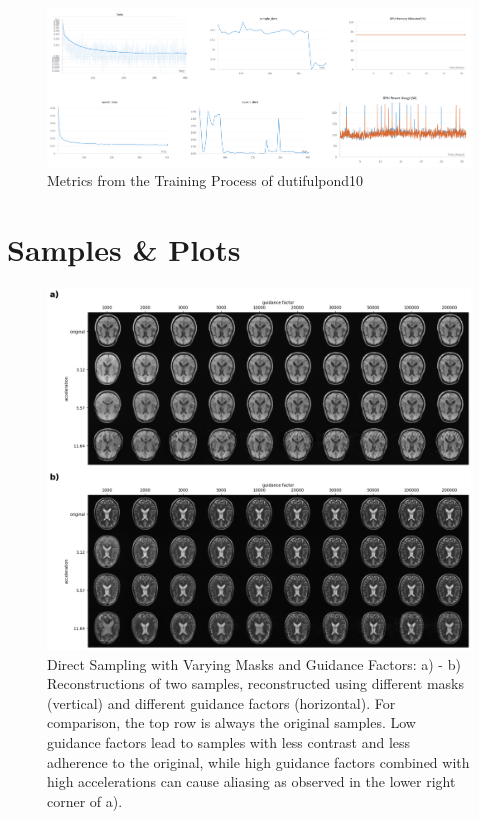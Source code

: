 \begin{figure}
    \centering
    \includegraphics[width=\textwidth]{images/dutifulpondmetrics.png}
    \caption[Metrics from the Training Process of dutifulpond10]{Metrics from the Training Process of dutifulpond10}
\end{figure}

\chapter{Samples \& Plots}
\begin{figure}[h]
    \centering
    \includegraphics[width=\textwidth]{images/directsampling_comparison.png}
    \caption[Direct Sampling with Varying Masks and Guidance Factors]{Direct Sampling with Varying Masks and Guidance Factors: a) - b) Reconstructions of two samples, reconstructed using different masks (vertical) and different guidance factors (horizontal). For comparison, the top row is always the original samples. Low guidance factors lead to samples with less contrast and less adherence to the original, while high guidance factors combined with high accelerations can cause aliasing as observed in the lower right corner of a).}
\end{figure}

